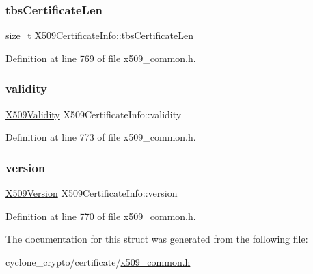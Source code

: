\mbox{\label{structX509CertificateInfo_a4db5f8e3cc589a8445eebf86863e205a}} 
\subsubsection{\texorpdfstring{tbs\+Certificate\+Len}{tbsCertificateLen}}
{\footnotesize\ttfamily size\+\_\+t X509\+Certificate\+Info\+::tbs\+Certificate\+Len}



Definition at line 769 of file x509\+\_\+common.\+h.

\mbox{\label{structX509CertificateInfo_aca3c2dbc54d2b8a711ed3b9c3c595fa8}} 
\subsubsection{\texorpdfstring{validity}{validity}}
{\footnotesize\ttfamily \hyperlink{structX509Validity}{X509\+Validity} X509\+Certificate\+Info\+::validity}



Definition at line 773 of file x509\+\_\+common.\+h.

\mbox{\label{structX509CertificateInfo_a15902fd60ae1f744a24fed017535891f}} 
\subsubsection{\texorpdfstring{version}{version}}
{\footnotesize\ttfamily \hyperlink{certificate_2x509__common_8h_a42c631650a1a4fbe9d70d54d99dcac26}{X509\+Version} X509\+Certificate\+Info\+::version}



Definition at line 770 of file x509\+\_\+common.\+h.



The documentation for this struct was generated from the following file\+:\begin{DoxyCompactItemize}
\item 
cyclone\+\_\+crypto/certificate/\hyperlink{certificate_2x509__common_8h}{x509\+\_\+common.\+h}\end{DoxyCompactItemize}
